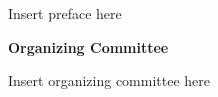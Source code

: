 \documentclass[letterpaper,11pt,oneside]{book} %
\begin{document}
Insert preface here 


\clearpage


\begin{center}
  {\Large \bf Organizing Committee}
\end{center}

\vspace*{0.5cm}


Insert organizing committee here
%
%  
\end{document}
